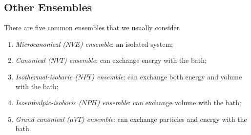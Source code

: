 \documentclass{article}
\theoremstyle{plain}\theoremheaderfont{\normalfont\bfseries}\theorembodyfont{\rmfamily}\theoremseparator{.}\newtheorem*{thm}{Theorem}\newtheorem*{law}{Law}\newtheorem*{pos}{Postulate}
\numberwithin{equation}{section}
\begin{document}
    \subsection{Other Ensembles}
    There are five common ensembles that we usually consider
    \begin{enumerate}[topsep=0pt,label=(\roman*)]
        \item \textit{Microcanonical (\(NVE\)) ensemble}: an isolated system;
        \item \textit{Canonical (\(NVT\)) ensemble}: can exchange energy with the bath;
        \item \textit{Isothermal-isobaric (\(NPT\)) ensemble}: can exchange both energy and volume with the bath;
        \item \textit{Isoenthalpic-isobaric (\(NPH\)) ensemble}: can exchange volume with the bath;
        \item \textit{Grand canonical (\(\mu VT\)) ensemble}: can exchange particles and energy with the bath.
    \end{enumerate}
\end{document}
